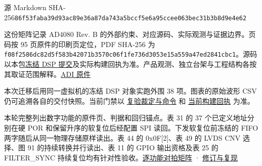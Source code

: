 \documentclass[UTF8,fontset=none,zihao=-4,a4paper]{ctexart}
\newcommand{\TraceDocumentTitle}[1]{%
  \par\noindent{\fontsize{24}{31}\selectfont\bfseries\color{TraceTitle}#1\par}%
  \vspace{3pt}\nopagebreak}
\newcommand{\TraceSection}[1]{%
  \par\addvspace{10pt}\noindent{\Large\bfseries\color{TraceTitle}#1\par}\nopagebreak[4]}
\newcommand{\TraceKeepHeading}{\par\penalty-120\relax}
\newcommand{\TraceCode}[1]{\texttt{\mdseries\upshape #1}}
\begin{document}
\color{TraceInk}
{\footnotesize\color{TraceMuted} 源 Markdown SHA-256\enspace\TraceCode{86f53faba39d\relax{}93ac89e36a87\penalty150\relax{}da743a5bccf5\penalty150\relax{}e6a95ccee063\penalty150\relax{}bec31b3b8d9e\penalty150\relax{}4e62}\par}
\hypertarget{trace-anchor-1}{}\TraceDocumentTitle{AD4080 数字外围逐模块手册审查}

这份矩阵记录 AD4080 Rev. B 的外部约束、\allowbreak{}对应源码、\allowbreak{}实际观测与证据边界。页码按 95 页原件的印刷页定位，PDF SHA-256 为 \TraceCode{f08f2586dc82\relax{}d5f583b42071\penalty150\relax{}b3570c06f1fe\penalty150\relax{}736d3053e15a\penalty150\relax{}559a47ed2841\penalty150\relax{}cbc1}。源码以本包\href{https://github.com/defineiocc02/20bit\_SAR\_ADC\_Behaviour\_Verification/blob/feat/ad4080-peripherals/rtl/ad4080\_periph/evidence/dsp-revision.txt}{冻结 DSP 提交}及实际构建回执为准。产品观测、\allowbreak{}独立台架与工程结构各按其取证范围解释。\href{https://www.analog.com/media/en/technical-documentation/data-sheets/ad4080.pdf}{ADI 原件}\par


\TraceKeepHeading{}\hypertarget{trace-anchor-2}{}\TraceSection{首要实测}

本次迁移后用同一虚拟机的冻结 DSP 对象实跑外围 38 项。图表的原始波形 CSV 仍可追溯各自的交付快照。当前门禁以 \href{https://github.com/defineiocc02/20bit\_SAR\_ADC\_Behaviour\_Verification/blob/feat/ad4080-peripherals/docs/audit/RTL\_REFACTOR.md}{复验裁定与命令} 和 \href{https://github.com/defineiocc02/20bit\_SAR\_ADC\_Behaviour\_Verification/blob/feat/ad4080-peripherals/rtl/ad4080\_periph/evidence/peripheral-review.json}{当前构建回执} 为准。\par

本轮完整列出数字功能的原件页、\allowbreak{}判据和回归锚点。表 31 的 37 个已定义地址分别在硬 POR 和保留升序的软复位后经配置 SPI 读回。下发软复位前冻结的 FIFO 两字随后从同一物理存储原样读出。表 44 的 0x0F[2]、\allowbreak{}表 49 的 LVDS CNV 选择、\allowbreak{}图 91 的持续转换并行读出、\allowbreak{}表 11 的 GPIO 输出资格及表 25 的 FILTER\_\relax{}SYNC 持续复位均有针对性验收。\href{https://github.com/defineiocc02/20bit\_SAR\_ADC\_Behaviour\_Verification/blob/feat/ad4080-peripherals/rtl/ad4080\_periph/evidence/manual-functional-coverage.csv}{逐功能对拍矩阵} · \href{https://github.com/defineiocc02/20bit\_SAR\_ADC\_Behaviour\_Verification/blob/feat/ad4080-peripherals/rtl/ad4080\_periph/integration/product/ACCEPTANCE.md}{修订与复现}\par
\end{document}
